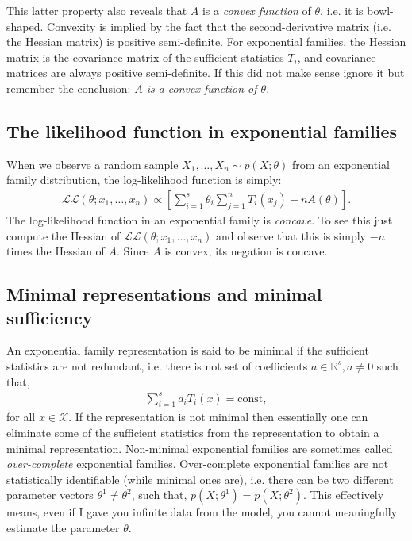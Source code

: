 \documentclass[twoside,12pt]{article}
\begin{document}
This latter property also reveals that $A$ is a \emph{convex function} of $\theta$, i.e. it is bowl-shaped. Convexity is implied by the fact that the second-derivative matrix (i.e. the Hessian matrix) is positive semi-definite. For exponential families, the Hessian matrix is the covariance matrix of the sufficient statistics $T_i$, and covariance matrices are always positive semi-definite. If this did not make sense ignore it but remember the conclusion: \emph{$A$ is a convex function of $\theta$}.

\subsection{The likelihood function in exponential families}
When we observe a random sample $X_1,\ldots,X_n \sim p(X;\theta)$ from an exponential family distribution, the log-likelihood function is simply:
\begin{align*}
\mathcal{L}\mathcal{L}(\theta; x_1,\ldots,x_n) \propto \left[ \sum_{i=1}^s \theta_i \sum_{j=1}^n T_i(x_j) - n A(\theta)\right].
\end{align*}
The log-likelihood function in an exponential family is \emph{concave}. To see this just compute the Hessian of $\mathcal{L}\mathcal{L}(\theta; x_1,\ldots,x_n)$ and observe that this is simply $-n$ times the Hessian of $A$. Since $A$ is convex, its negation is concave.

\subsection{Minimal representations and minimal sufficiency}
An exponential family representation is said to be minimal if the sufficient statistics are not redundant, i.e. there is not set of coefficients $a \in \mathbb{R}^s, a \neq 0$ such that,
\begin{align*}
\sum_{i=1}^s a_i T_i(x) = \text{const},
\end{align*}
for all $x \in \mathcal{X}$. If the representation is not minimal then essentially one can eliminate some of the sufficient statistics from the representation to obtain a minimal representation. Non-minimal exponential families are sometimes called \emph{over-complete} exponential families. Over-complete exponential families are not statistically identifiable (while minimal ones are), i.e. there can be two different parameter vectors $\theta^1 \neq \theta^2$, such that, $p(X;\theta^1) = p(X;\theta^2)$. This effectively means, even if I gave you infinite data from the model, you cannot meaningfully estimate the parameter $\theta$.
\end{document}

